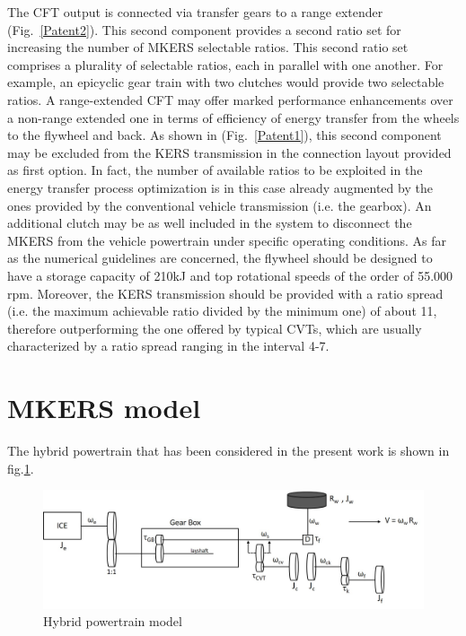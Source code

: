 \documentclass[11pt]{article}
\begin{document}
The CFT output is connected via transfer gears to a range extender (Fig.~\ref{Patent2}). This second component provides a second ratio set for increasing the number of MKERS selectable ratios. This second ratio set comprises a plurality of selectable ratios, each in parallel with one another. For example, an epicyclic gear train with two clutches would provide two selectable ratios. A range-extended CFT may offer marked performance enhancements over a non-range extended one in terms of efficiency of energy transfer from the wheels to the flywheel and back.  As shown in (Fig.~\ref{Patent1}), this second component may be excluded from the KERS transmission in the connection layout provided as first option. In fact, the number of available ratios to be exploited in the energy transfer process optimization is in this case already augmented by the ones provided by the conventional vehicle transmission (i.e. the gearbox).  An additional clutch may be as well included in the system to disconnect the MKERS from the vehicle powertrain under specific operating conditions.
As far as the numerical guidelines are concerned, the flywheel should be designed to have a storage capacity of 210kJ and top rotational speeds of the order of 55.000 rpm. Moreover, the KERS transmission should be provided with a ratio spread (i.e. the maximum achievable ratio divided by the minimum one) of about 11, therefore outperforming the one offered by typical CVTs, which are usually characterized by a ratio spread ranging in the interval 4-7.  

\section{MKERS model}

The hybrid powertrain that has been considered in the present work is shown in fig.\ref{model}.   

\begin{figure}[H]
\centering
\includegraphics[width=1\textwidth]{Images/Model/Model.jpg}
\caption{Hybrid powertrain model}
\label{model}
\end{figure}
\end{document}
